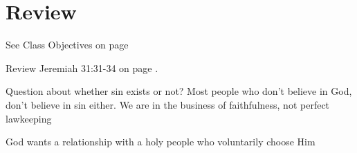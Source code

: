 \chapter{Review}

\begin{goals}
\goal See Class Objectives on page \pageref{sec:ClassObjectives}
\end{goals}
\begin{bible}
Review Jeremiah 31:31-34 on page \pageref{sec:KeyPassage}.
\end{bible}

\begin{discussion}
Question about whether sin exists or not? Most people who don't believe in God, don't believe in sin either.
We are in the business of faithfulness, not perfect lawkeeping

God wants a relationship with a holy people who voluntarily choose Him




\end{discussion}